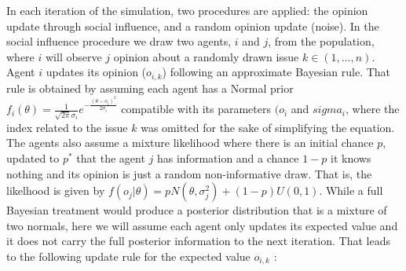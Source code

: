\documentclass{article}
\begin{document}


In each iteration of the simulation, two procedures are applied: the
opinion update through social influence, and a random opinion update (noise). In
the social influence procedure we draw two agents, \(i\) and \(j\), from the
population, where \(i\) will observe \(j\) opinion about a randomly drawn issue \(k
\in (1 , \ldots, n)\). %
Agent \(i\)
updates its opinion (\(o_{i,k}\)) following an approximate Bayesian rule. That rule is obtained by assuming each agent has a
Normal prior \(f_i(\theta) = \frac{1}{\sqrt{2 \pi} \sigma_i} e^{- \frac{(\theta
- o_i )^2}{2 \sigma_i}} \) compatible with its parameters $(o_{i}$ and $sigma_{i}$, where the index related to the issue $k$ was omitted for the sake of simplifying the equation.  The agents also assume a mixture likelihood where there is an initial chance
\(p\), updated to \(p^*\) that the agent \(j\) has information and a chance
\(1-p\) it knows nothing and its opinion is just a random non-informative draw. That is, the likelhood is given by
 \( f(o_j|\theta) = p N(\theta,\sigma_j^2) + (1-p)U(0,1) \). While a full Bayesian treatment would produce a posterior distribution that is a mixture of two normals, here we will assume each agent only updates its expected value and it does not carry the full posterior information to the next iteration. That leads to the following update rule for the expected value $o_{i,k}$ \cite{martins12b}:
\end{document}
